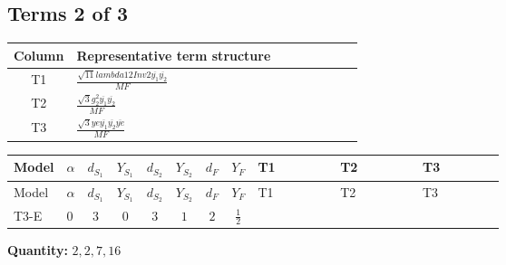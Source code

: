 \documentclass[8pt]{article}
\begin{document}
\begin{landscape}
\subsection*{Terms 2 of 3}
\begin{center}
\begin{tabular}{@{}c >{\raggedright\arraybackslash}p{0.82\linewidth}@{}}
\toprule
Column & Representative term structure \\
\midrule
T1 & \(\displaystyle \frac{\sqrt{11} lambda12Inv2 \overline{y_{1}} \overline{y_{2}}}{MF}\) \\
\midrule
T2 & \(\displaystyle \frac{\sqrt{3} g_{2}^{2} \overline{y_{1}} \overline{y_{2}}}{MF}\) \\
\midrule
T3 & \(\displaystyle \frac{\sqrt{3} ye \overline{y_{1}} \overline{y_{2}} \overline{ye}}{MF}\) \\
\midrule
\bottomrule
\end{tabular}
\end{center}
\smallskip
\tiny
\begin{longtable}{@{}llcccccc >{\raggedright\arraybackslash}p{0.21\linewidth} >{\raggedright\arraybackslash}p{0.21\linewidth} >{\raggedright\arraybackslash}p{0.21\linewidth}@{}}
\toprule
Model & $\alpha$ & $d_{S_1}$ & $Y_{S_1}$ & $d_{S_2}$ & $Y_{S_2}$ & $d_F$ & $Y_F$ & T1 & T2 & T3 \\
\midrule
\endfirsthead
\toprule
Model & $\alpha$ & $d_{S_1}$ & $Y_{S_1}$ & $d_{S_2}$ & $Y_{S_2}$ & $d_F$ & $Y_F$ & T1 & T2 & T3 \\
\midrule
\endhead
T3-E & $0$ & $3$ & $0$ & $3$ & $1$ & $2$ & $\frac{1}{2}$ & \scriptsize\adjustbox{max width=\linewidth}{$\begin{gathered} \frac{3 \sqrt{11} lambda12Inv2 \overline{y_{1}} \overline{y_{2}}}{22 MF}\end{gathered}$} & \scriptsize\adjustbox{max width=\linewidth}{$\begin{gathered} \frac{49 \sqrt{3} g_{2}^{2} \overline{y_{1}} \overline{y_{2}}}{24 MF}\end{gathered}$} & \scriptsize\adjustbox{max width=\linewidth}{$\begin{gathered} - \frac{\sqrt{3} ye \overline{y_{1}} \overline{y_{2}} \overline{ye}}{12 MF}\end{gathered}$} \\
\midrule
\bottomrule
\end{longtable}
\clearpage
\noindent\textbf{Quantity: }$\mathrm{2,2,7,16}$\par\smallskip

\end{landscape}
\end{document}
